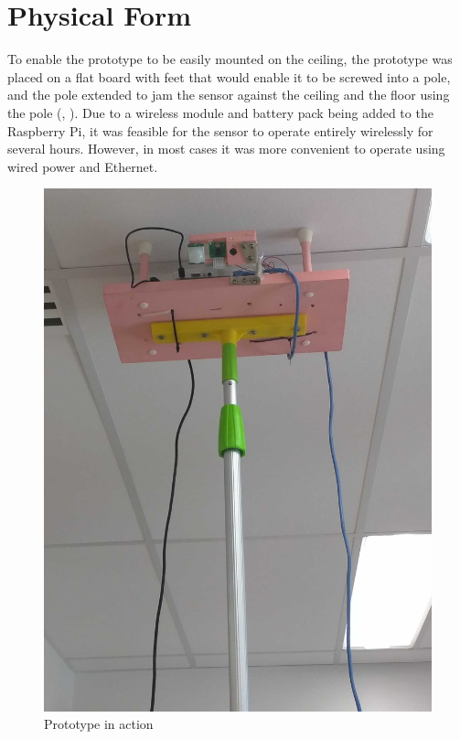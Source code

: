 \chapter{Physical Form}
To enable the prototype to be easily mounted on the ceiling, the prototype was placed on a flat board with feet that would enable it to be screwed into a pole, and the pole extended to jam the sensor against the ceiling and the floor using the pole (, ). Due to a wireless module and battery pack being added to the Raspberry Pi, it was feasible for the sensor to operate entirely wirelessly for several hours. However, in most cases it was more convenient to operate using wired power and Ethernet.

\begin{figure}[H]
\centering
\includegraphics[height=0.5\textheight]{../diagrams/prototype-mounted-ceiling.jpg}
\caption{Prototype in action}
\label{fig:pictures:protoact}
\end{figure}

